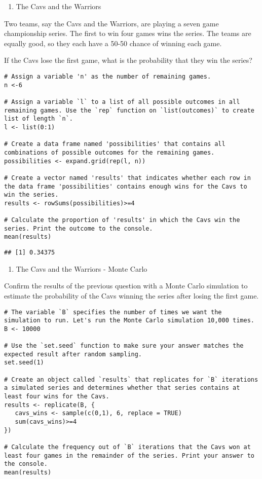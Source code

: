 \documentclass[
]{article}
\providecommand{\tightlist}{%
  \setlength{\itemsep}{0pt}\setlength{\parskip}{0pt}}
\begin{document}
\begin{enumerate}
\def\labelenumi{\arabic{enumi}.}
\tightlist
\item
  The Cavs and the Warriors
\end{enumerate}

Two teams, say the Cavs and the Warriors, are playing a seven game
championship series. The first to win four games wins the series. The
teams are equally good, so they each have a 50-50 chance of winning each
game.

If the Cavs lose the first game, what is the probability that they win
the series?

\begin{verbatim}
# Assign a variable 'n' as the number of remaining games.
n <-6

# Assign a variable `l` to a list of all possible outcomes in all remaining games. Use the `rep` function on `list(outcomes)` to create list of length `n`.
l <- list(0:1)

# Create a data frame named 'possibilities' that contains all combinations of possible outcomes for the remaining games.
possibilities <- expand.grid(rep(l, n))

# Create a vector named 'results' that indicates whether each row in the data frame 'possibilities' contains enough wins for the Cavs to win the series.
results <- rowSums(possibilities)>=4

# Calculate the proportion of 'results' in which the Cavs win the series. Print the outcome to the console.
mean(results)
\end{verbatim}

\begin{verbatim}
## [1] 0.34375
\end{verbatim}

\begin{enumerate}
\def\labelenumi{\arabic{enumi}.}
\setcounter{enumi}{2}
\tightlist
\item
  The Cavs and the Warriors - Monte Carlo
\end{enumerate}

Confirm the results of the previous question with a Monte Carlo
simulation to estimate the probability of the Cavs winning the series
after losing the first game.

\begin{verbatim}
# The variable `B` specifies the number of times we want the simulation to run. Let's run the Monte Carlo simulation 10,000 times.
B <- 10000

# Use the `set.seed` function to make sure your answer matches the expected result after random sampling.
set.seed(1)

# Create an object called `results` that replicates for `B` iterations a simulated series and determines whether that series contains at least four wins for the Cavs.
results <- replicate(B, {
   cavs_wins <- sample(c(0,1), 6, replace = TRUE)
   sum(cavs_wins)>=4
})

# Calculate the frequency out of `B` iterations that the Cavs won at least four games in the remainder of the series. Print your answer to the console.
mean(results)
\end{verbatim}
\end{document}
